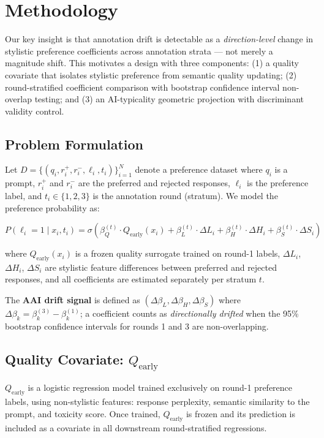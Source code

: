 \section{Methodology}
\label{sec:method}

Our key insight is that annotation drift is detectable as a \emph{direction-level} change in stylistic preference coefficients across annotation strata --- not merely a magnitude shift. This motivates a design with three components: (1) a quality covariate that isolates stylistic preference from semantic quality updating; (2) round-stratified coefficient comparison with bootstrap confidence interval non-overlap testing; and (3) an AI-typicality geometric projection with discriminant validity control.

\subsection{Problem Formulation}

Let $D = \{(q_i, r_i^+, r_i^-, \ell_i, t_i)\}_{i=1}^N$ denote a preference dataset where $q_i$ is a prompt, $r_i^+$ and $r_i^-$ are the preferred and rejected responses, $\ell_i$ is the preference label, and $t_i \in \{1, 2, 3\}$ is the annotation round (stratum). We model the preference probability as:

\begin{equation}
P(\ell_i = 1 \mid x_i, t_i) = \sigma\!\left(\beta_Q^{(t)} \cdot Q_{\text{early}}(x_i) + \beta_L^{(t)} \cdot \Delta L_i + \beta_H^{(t)} \cdot \Delta H_i + \beta_S^{(t)} \cdot \Delta S_i\right)
\end{equation}

where $Q_{\text{early}}(x_i)$ is a frozen quality surrogate trained on round-1 labels, $\Delta L_i$, $\Delta H_i$, $\Delta S_i$ are stylistic feature differences between preferred and rejected responses, and all coefficients are estimated separately per stratum $t$.

The \textbf{AAI drift signal} is defined as $(\Delta\beta_L, \Delta\beta_H, \Delta\beta_S)$ where $\Delta\beta_k = \beta_k^{(3)} - \beta_k^{(1)}$; a coefficient counts as \emph{directionally drifted} when the 95\% bootstrap confidence intervals for rounds 1 and 3 are non-overlapping.

\subsection{Quality Covariate: $Q_\text{early}$}

\textbf{$Q_\text{early}$} is a logistic regression model trained exclusively on round-1 preference labels, using non-stylistic features: response perplexity, semantic similarity to the prompt, and toxicity score. Once trained, $Q_\text{early}$ is frozen and its prediction is included as a covariate in all downstream round-stratified regressions.

